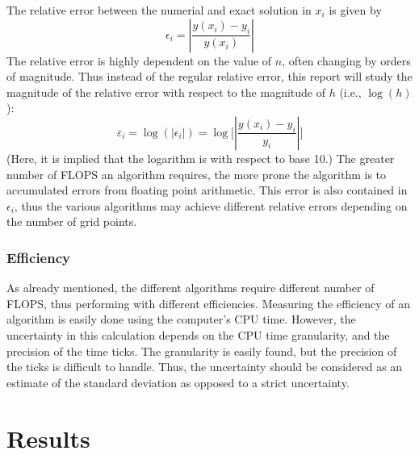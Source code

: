 \documentclass[reprint,english]{revtex4-1}
\begin{document}
The relative error between the numerial and exact solution in \(x_i\) is given by
\begin{equation}\label{eq:relative_error}
\epsilon_i=\left|\frac{y(x_i)-y_i}{y(x_i)}\right|
\end{equation}
The relative error is highly dependent on the value of \(n\), often changing by orders of magnitude. Thus instead of the regular relative error, this report will study the magnitude of the relative error with respect to the magnitude of \(h\) (i.e., \(\log(h)\)):
\begin{equation}\label{eq:relative_error_magnitude}
\varepsilon_i=\log(|\epsilon_i|)=\log\bigg[\left|\frac{y(x_i)-y_i}{y_i}\right|\bigg]
\end{equation}
(Here, it is implied that the logarithm is with respect to base 10.)
The greater number of FLOPS an algorithm requires, the more prone the algorithm is to accumulated errors from floating point arithmetic. This error is also contained in \(\epsilon_i\), thus the various algorithms may achieve different relative errors depending on the number of grid points.
\subsubsection{Efficiency}
As already mentioned, the different algorithms require different number of FLOPS, thus performing with different efficiencies. Measuring the efficiency of an algorithm is easily done using the computer's CPU time. However, the uncertainty in this calculation depends on the CPU time granularity, and the precision of the time ticks. The granularity is easily found, but the precision of the ticks is difficult to handle. Thus, the uncertainty should be considered as an estimate of the standard deviation as opposed to a strict uncertainty.
\clearpage
\section{Results}
\end{document}
